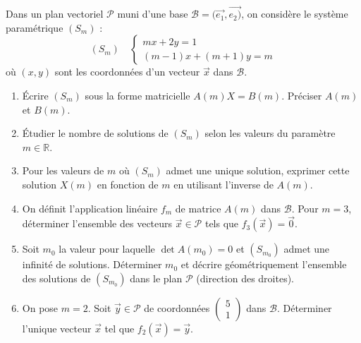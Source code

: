 \documentclass[11pt]{article}
\begin{document}
\begin{exercice}
Dans un plan vectoriel $\mathcal{P}$ muni d'une base $\mathcal{B}=(\vec{e_1},\vec{e_2)}$, on considère le système paramétrique $(S_m)$ :
\[
(S_m) \quad \begin{cases}
mx + 2y = 1 \\
(m-1)x + (m+1)y = m
\end{cases}
\]
où $(x,y)$ sont les coordonnées d'un vecteur $\vec{x}$ dans $\mathcal{B}$.
\begin{enumerate}
    \item Écrire $(S_m)$ sous la forme matricielle $A(m) X = B(m)$. Préciser $A(m)$ et $B(m)$.
    \item Étudier le nombre de solutions de $(S_m)$ selon les valeurs du paramètre $m \in \mathbb{R}$.
    \item Pour les valeurs de $m$ où $(S_m)$ admet une unique solution, exprimer cette solution $X(m)$ en fonction de $m$ en utilisant l'inverse de $A(m)$.
    \item On définit l'application linéaire $f_m$ de matrice $A(m)$ dans $\mathcal{B}$. Pour $m=3$, déterminer l'ensemble des vecteurs $\vec{x} \in \mathcal{P}$ tels que $f_3(\vec{x}) = \vec{0}$.
    \item Soit $m_0$ la valeur pour laquelle $\det A(m_0) = 0$ et $(S_{m_0})$ admet une infinité de solutions. Déterminer $m_0$ et décrire géométriquement l'ensemble des solutions de $(S_{m_0})$ dans le plan $\mathcal{P}$ (direction des droites).
    \item On pose $m=2$. Soit $\vec{y} \in \mathcal{P}$ de coordonnées $\begin{pmatrix} 5 \\ 1 \end{pmatrix}$ dans $\mathcal{B}$. Déterminer l'unique vecteur $\vec{x}$ tel que $f_2(\vec{x}) = \vec{y}$.
\end{enumerate}
\end{exercice}
\end{document}
